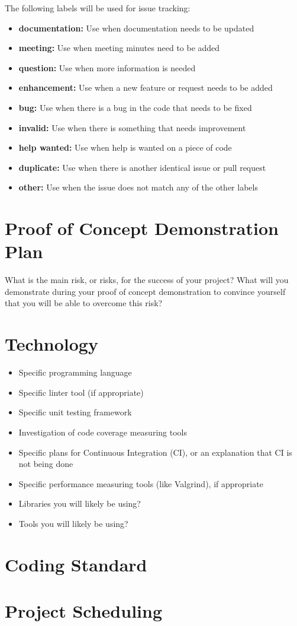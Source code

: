 \documentclass{article}
\begin{document}
The following labels will be used for issue tracking:
\begin{itemize}
    \item \textbf{documentation:} Use when documentation needs to be updated
    \item \textbf{meeting:} Use when meeting minutes need to be added
    \item \textbf{question:} Use when more information is needed
    \item \textbf{enhancement:} Use when a new feature or request needs to be added
    \item \textbf{bug:} Use when there is a bug in the code that needs to be fixed
    \item \textbf{invalid:} Use when there is something that needs improvement
    \item \textbf{help wanted:} Use when help is wanted on a piece of code
    \item \textbf{duplicate:} Use when there is another identical issue or pull request
    \item \textbf{other:} Use when the issue does not match any of the other labels
\end{itemize}

\section{Proof of Concept Demonstration Plan}

What is the main risk, or risks, for the success of your project?  What will you
demonstrate during your proof of concept demonstration to convince yourself that
you will be able to overcome this risk?

\section{Technology}

\begin{itemize}
\item Specific programming language
\item Specific linter tool (if appropriate)
\item Specific unit testing framework
\item Investigation of code coverage measuring tools
\item Specific plans for Continuous Integration (CI), or an explanation that CI
  is not being done
\item Specific performance measuring tools (like Valgrind), if
  appropriate
\item Libraries you will likely be using?
\item Tools you will likely be using?
\end{itemize}

\section{Coding Standard}

\section{Project Scheduling}

\end{document}
